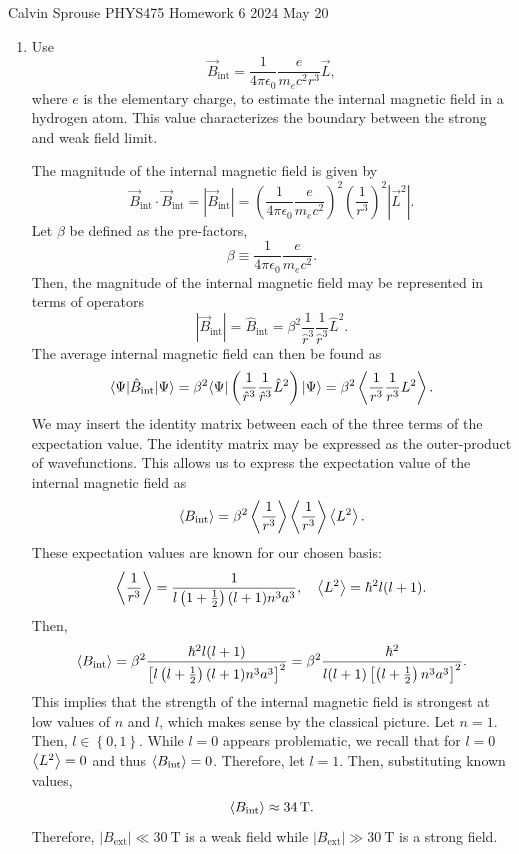 \documentclass[a4paper, 12pt]{config/homework}
\begin{document}
\noindent
Calvin Sprouse \hfill PHYS475 Homework 6 \hfill 2024 May 20
\bigskip

\begin{enumerate}
\item Use
\[\vec{B}_\text{int} = \frac{1}{4\pi \epsilon_0} \frac{e}{m_e c^2 r^3} \vec{L},\]
where \(e\) is the elementary charge, to estimate the internal magnetic field in a hydrogen atom. This value characterizes the boundary between the strong and weak field limit.

\bigskip
The magnitude of the internal magnetic field is given by
\[\vec{B}_\text{int}\cdot\vec{B}_\text{int}
= \left|\vec{B}_\text{int}\right|
= \left(\frac{1}{4\pi\epsilon_0}\frac{e}{m_e c^2}\right)^2\left(\frac{1}{r^3}\right)^2 \left|\vec{L}^2\right|.\]
Let \(\beta\) be defined as the pre-factors,
\[\beta \equiv \frac{1}{4\pi\epsilon_0}\frac{e}{m_e c^2}.\]
Then, the magnitude of the internal magnetic field may be represented in terms of operators
\[\left|\vec{B}_\text{int}\right|
= \hat{B}_\text{int} = \beta^2\frac{1}{\hat{r}^3}\frac{1}{\hat{r}^3}\hat{L}^2.\]
The average internal magnetic field can then be found as
\[\bra*{\Psi}\hat{B}_\text{int}\ket*{\Psi}
= \beta^2\bra*{\Psi}\left(\frac{1}{\hat{r}^3}\frac{1}{\hat{r}^3}\hat{L}^2\right)\ket*{\Psi} = \beta^2 \expval{\frac{1}{r^3}\frac{1}{r^3}L^2}.\]
We may insert the identity matrix between each of the three terms of the expectation value. The identity matrix may be expressed as the outer-product of wavefunctions. This allows us to express the expectation value of the internal magnetic field as
\[\left\langle B_\text{int} \right\rangle = \beta^2\left\langle \frac{1}{r^3} \right\rangle\left\langle \frac{1}{r^3} \right\rangle\left\langle L^2 \right\rangle.\]
These expectation values are known for our chosen basis:
\[\left\langle \frac{1}{r^3} \right\rangle = \frac{1}{l\left(1+\frac{1}{2}\right)(l+1)n^3a^3}, \quad
\left\langle L^2 \right\rangle = \hbar^2l(l+1).\]
Then,
\[\left\langle B_\text{int} \right\rangle = \beta^2\frac{\hbar^2l(l+1)}{\left[l\left(l+\frac{1}{2}\right)(l+1)n^3a^3\right]^2} = \beta^2 \frac{\hbar^2}{l(l+1)\left[\left(l+\frac{1}{2}\right)n^3a^3\right]^2}.\]
This implies that the strength of the internal magnetic field is strongest at low values of \(n\) and \(l\), which makes sense by the classical picture. Let \(n=1\). Then, \(l\in\left\{0, 1\right\}\). While \(l=0\) appears problematic, we recall that for \(l=0\) \(\left\langle L^2 \right\rangle=0\) and thus \(\left\langle B_\text{int} \right\rangle=0\). Therefore, let \(l=1\). Then, substituting known values,
\[\left\langle B_\text{int} \right\rangle \approx \qty{34}{\tesla}.\]
Therefore, \(\left|B_\text{ext}\right|\ll \qty{30}{\tesla}\) is a weak field while \(\left|B_\text{ext}\right| \gg \qty{30}{\tesla}\) is a strong field.



\end{enumerate}
\end{document}
